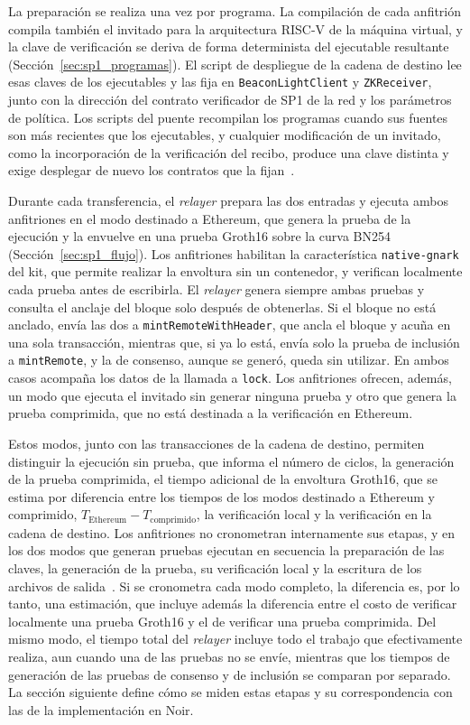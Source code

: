 La preparación se realiza una vez por programa. La compilación de cada anfitrión compila también el
invitado para la arquitectura RISC-V de la máquina virtual, y la clave de verificación se deriva de
forma determinista del ejecutable resultante (Sección~\ref{sec:sp1_programas}). El script de
despliegue de la cadena de destino lee esas claves de los ejecutables y las fija en
\texttt{BeaconLightClient} y \texttt{ZKReceiver}, junto con la dirección del contrato verificador
de SP1 de la red y los parámetros de política. Los scripts del puente recompilan los programas
cuando sus fuentes son más recientes que los ejecutables, y cualquier modificación de un invitado,
como la incorporación de la verificación del recibo, produce una clave distinta y exige desplegar
de nuevo los contratos que la fijan~\cite{zkguaranibridgesp1}.

Durante cada transferencia, el \textit{relayer} prepara las dos entradas y ejecuta ambos
anfitriones en el modo destinado a Ethereum, que genera la prueba de la ejecución y la envuelve en
una prueba Groth16 sobre la curva BN254 (Sección~\ref{sec:sp1_flujo}). Los anfitriones habilitan
la característica \texttt{native-gnark} del kit, que permite realizar la envoltura sin un
contenedor, y verifican localmente cada prueba antes de escribirla. El \textit{relayer} genera
siempre ambas pruebas y consulta el anclaje del bloque solo después de obtenerlas. Si el bloque no
está anclado, envía las dos a \lstinline|mintRemoteWithHeader|, que ancla el bloque y acuña en una
sola transacción, mientras que, si ya lo está, envía solo la prueba de inclusión a
\lstinline|mintRemote|, y la de consenso, aunque se generó, queda sin utilizar. En ambos casos acompaña los datos de la llamada a \texttt{lock}. Los anfitriones
ofrecen, además, un modo que ejecuta el invitado sin generar ninguna prueba y otro que genera la
prueba comprimida, que no está destinada a la verificación en Ethereum.

Estos modos, junto con las transacciones de la cadena de destino, permiten distinguir la ejecución
sin prueba, que informa el número de ciclos, la generación de la prueba comprimida, el tiempo
adicional de la envoltura Groth16, que se estima por diferencia entre los tiempos de los modos
destinado a Ethereum y comprimido, $T_{\mathrm{Ethereum}} - T_{\mathrm{comprimido}}$, la
verificación local y la verificación en la cadena de destino. Los anfitriones no cronometran
internamente sus etapas, y en los dos modos que generan pruebas ejecutan en secuencia la
preparación de las claves, la generación de la prueba, su verificación local y la escritura de los
archivos de salida~\cite{sp1synccommitteerepo, txinclusionsp1repo}. Si se cronometra cada modo
completo, la diferencia es, por lo tanto, una estimación, que incluye además la diferencia entre el
costo de verificar localmente una prueba Groth16 y el de verificar una prueba comprimida. Del mismo
modo, el tiempo total del \textit{relayer} incluye todo el trabajo que efectivamente realiza, aun
cuando una de las pruebas no se envíe, mientras que los tiempos de generación de las pruebas de
consenso y de inclusión se comparan por separado. La sección siguiente define cómo se miden estas
etapas y su correspondencia con las de la implementación en Noir.
